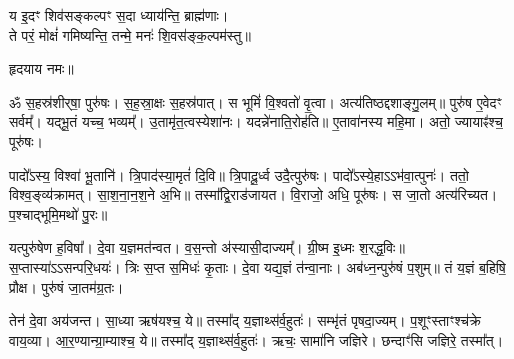 \begin{center}






य इ॒दꣳ शिव॑सङ्कल्पꣳ स॒दा ध्याय॑न्ति॒ ब्राह्म॑णाः।\\
 ते परं॒ मोक्षं॑ गमिष्यन्ति॒ तन्मे॒ मनः॑ शि॒वस॑ङ्क॒ल्पम॑स्तु॥

हृदयाय नमः॥
\end{center}
{\small \closesection}

ॐ स॒हस्र॑शीर्‌षा॒ पुरु॑षः। स॒ह॒स्रा॒क्षः स॒हस्र॑पात्। स भूमिं॑ वि॒श्वतो॑ वृ॒त्वा। अत्य॑तिष्ठद्दशाङ्गु॒लम्॥ पुरु॑ष ए॒वेदꣳ सर्वम्᳚। यद्भू॒तं यच्च॒ भव्यम्᳚। उ॒तामृ॑त॒त्वस्येशा॑नः। यदन्ने॑नाति॒रोह॑ति॥ ए॒तावा॑नस्य महि॒मा। अतो॒ ज्यायाꣴ॑श्च॒ पूरु॑षः।

 पादो᳚ऽस्य॒ विश्वा॑ भू॒तानि॑। त्रि॒पाद॑स्या॒मृतं॑ दि॒वि॥ त्रि॒पादू॒र्ध्व उदै॒त्पुरु॑षः। पादो᳚ऽस्ये॒हाऽऽभ॑वा॒त्पुनः॑। ततो॒ विश्व॒ङ्व्य॑क्रामत्। सा॒श॒ना॒न॒श॒ने अ॒भि॥ तस्मा᳚द्वि॒राड॑जायत। वि॒राजो॒ अधि॒ पूरु॑षः। स जा॒तो अत्य॑रिच्यत। प॒श्चाद्भूमि॒मथो॑ पु॒रः॥

 यत्पुरु॑षेण ह॒विषा᳚। दे॒वा य॒ज्ञमत॑न्वत। व॒स॒न्तो अ॑स्यासी॒दाज्यम्᳚। ग्री॒ष्म इ॒ध्मः श॒रद्ध॒विः॥ स॒प्तास्या॑ऽऽ\-सन्परि॒धयः॑। त्रिः स॒प्त स॒मिधः॑ कृ॒ताः। दे॒वा यद्य॒ज्ञं त॑न्वा॒नाः। अब॑ध्न॒न्पुरु॑षं प॒शुम्॥ तं य॒ज्ञं ब॒\ar हिषि॒ प्रौक्ष\sn। पुरु॑षं जा॒तम॑ग्र॒तः।

 तेन॑ दे॒वा अय॑जन्त। सा॒ध्या ऋष॑यश्च॒ ये॥ तस्मा᳚द् य॒ज्ञाथ्स॑र्व॒हुतः॑। सम्भृ॑तं पृषदा॒ज्यम्। प॒शूꣳस्ताꣳश्च॑क्रे वाय॒व्या\sn{}। आ॒र॒ण्यान्ग्रा॒म्याश्च॒ ये॥ तस्मा᳚द् य॒ज्ञाथ्स॑र्व॒हुतः॑। ऋचः॒ सामा॑नि जज्ञिरे। छन्दाꣳ॑सि जज्ञिरे॒ तस्मा᳚त्।

